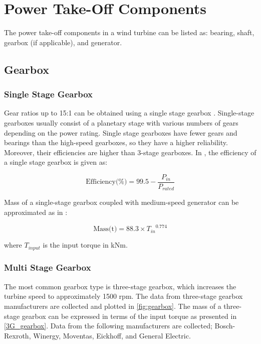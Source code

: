 \documentclass{article}\usepackage{graphicx, color}
\begin{document}
\section{Power Take-Off Components}

The power take-off components in a wind turbine can be listed as: bearing, shaft, gearbox (if applicable), and generator. 

\subsection{Gearbox}

\subsubsection{Single Stage Gearbox}
Gear ratios up to 15:1 can be obtained using a single stage gearbox \cite{Cotrell2002}. Single-stage gearboxes usually consist of a planetary stage with various numbers of gears depending on the power rating. Single stage gearboxes have fewer gears and bearings than the high-speed gearboxes, so they have a higher reliability. Moreover, their efficiencies are higher than 3-stage gearboxes. In \cite{Matveev2011}, the efficiency of a single stage gearbox is given as:

\begin{equation}
  \text{Efficiency(\%)} = 99.5 - \dfrac{P_{in}}{P_{rated}}
\end{equation}

Mass of a single-stage gearbox coupled with medium-speed generator can be approximated as in \cite{Fingersh2006}:

\begin{equation}
	\text{Mass(t)} = 88.3 \times {T_{in}}^{0.774}
\end{equation}

where $T_{input}$ is the input torque in kNm.

\subsubsection{Multi Stage Gearbox}

The most common gearbox type is three-stage gearbox, which increases the turbine speed to approximately 1500 rpm. The data from three-stage gearbox manufacturers are collected and plotted in \autoref{fig:gearbox}.
The mass of a three-stage gearbox can be expressed in terms of the input torque as presented in \autoref{3G_gearbox}. Data from the following manufacturers are collected; Bosch-Rexroth\cite{bosch}, Winergy\cite{winergy}, Moventas\cite{Moventas}, Eickhoff\cite{eickhoff}, and General Electric\cite{GE}. 
\end{document}

